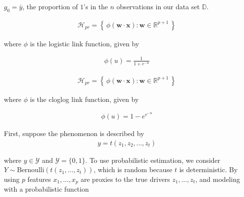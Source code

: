 \documentclass[12pt]{article}
\begin{document}
\begin{enumerate}


$g_0=\bar{y}$, the proportion of $1$'s in the $n$ observations in our data set
$\mathbb{D}$.


\begin{align*}
	\mathcal{H}_{pr} = \left\{\,
		\phi(\mathbf{w}\cdot \mathbf{x}): \mathbf{w}\in \mathbb{R}^{p+1}
	\,\right\}
\end{align*}

where $\phi$ is the logistic link function, given by

\begin{align*}
	\phi(u) = \frac{1}{1 + e^{-u}}	
\end{align*}


\begin{align*}
	\mathcal{H}_{pr} = \left\{\,
	\phi(\mathbf{w}\cdot \mathbf{x}): \mathbf{w}\in \mathbb{R}^{p+1}
	\,\right\}
\end{align*}

where $\phi$ is the cloglog link function, given by

\begin{align*}
	\phi(u) = 1 - e^{e^{-u}}
\end{align*}


First, suppose the phenomenon is described by
\begin{align*}
	y = t(z_1,z_2,\ldots,z_t)
\end{align*}

where $y\in \mathcal{Y}$ and $\mathcal{Y} = \{0, 1\}$. To use probabilistic
estimation, we consider $Y \sim \text{Bernoulli}(t(z_1,\ldots,z_t))$, which
is  random because $t$ is deterministic. By using $p$ features
$x_1,\ldots,x_p$ are proxies to the true drivers $z_1,\ldots,z_t$, and
modeling with a probabilistic function


\end{enumerate}
\end{document}
